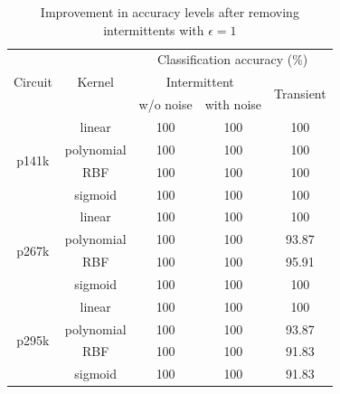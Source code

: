 \begin{table}[h]
\begin{tabular}{ccccc}
\hline
\multirow{3}{*}{Circuit} & \multirow{3}{*}{Kernel} & \multicolumn{3}{c}{Classification accuracy (\%)}              \\ \cline{3-5} 
                         &                         & \multicolumn{2}{c}{Intermittent} & \multirow{2}{*}{Transient} \\ \cline{3-4}
                         &                         & w/o noise      & with noise      &                            \\ \hline
\multirow{4}{*}{p141k}   & linear                  & 100            & 100             & 100                        \\
                         & polynomial              & 100            & 100             & 100                        \\
                         & RBF                     & 100            & 100             & 100                        \\
                         & sigmoid                 & 100            & 100             & 100                        \\
\hline
\multirow{4}{*}{p267k}   & linear                  & 100            & 100             & 100                        \\
                         & polynomial              & 100            & 100             & 93.87                      \\
                         & RBF                     & 100            & 100             & 95.91                      \\
                         & sigmoid                 & 100            & 100             & 100                        \\
\hline
\multirow{4}{*}{p295k}   & linear                  & 100            & 100             & 100                        \\
                         & polynomial              & 100            & 100             & 93.87                      \\
                         & RBF                     & 100            & 100             & 91.83                      \\
                         & sigmoid                 & 100            & 100             & 91.83                     \\
\hline
\end{tabular}
\caption{Improvement in accuracy levels after removing intermittents with $\epsilon = 1$}
\label{tab:intsweep}
\end{table}

